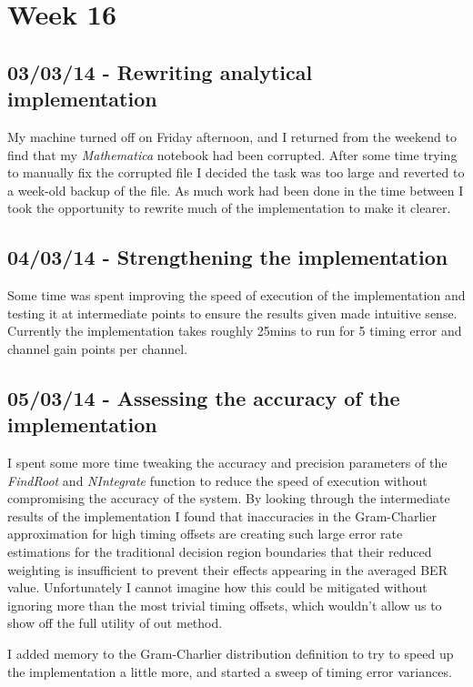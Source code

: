 \section{Week 16}

\subsection{03/03/14 - Rewriting analytical implementation}

My machine turned off on Friday afternoon, and I returned from the
weekend to find that my \emph{Mathematica} notebook had been corrupted.
After some time trying to manually fix the corrupted file I decided the
task was too large and reverted to a week-old backup of the file. As
much work had been done in the time between I took the opportunity to
rewrite much of the implementation to make it clearer.

\subsection{04/03/14 - Strengthening the implementation}

Some time was spent improving the speed of execution of the
implementation and testing it at intermediate points to ensure the
results given made intuitive sense. Currently the implementation takes
roughly 25mins to run for 5 timing error and channel gain points per
channel.

\subsection{05/03/14 - Assessing the accuracy of the implementation}

I spent some more time tweaking the accuracy and precision parameters of
the \emph{FindRoot} and \emph{NIntegrate} function to reduce the speed
of execution without compromising the accuracy of the system. By looking
through the intermediate results of the implementation I found that
inaccuracies in the Gram-Charlier approximation for high timing offsets
are creating such large error rate estimations for the traditional
decision region boundaries that their reduced weighting is insufficient
to prevent their effects appearing in the averaged BER value.
Unfortunately I cannot imagine how this could be mitigated without
ignoring more than the most trivial timing offsets, which wouldn't allow
us to show off the full utility of out method.

I added memory to the Gram-Charlier distribution definition to try to
speed up the implementation a little more, and started a sweep of timing
error variances.

